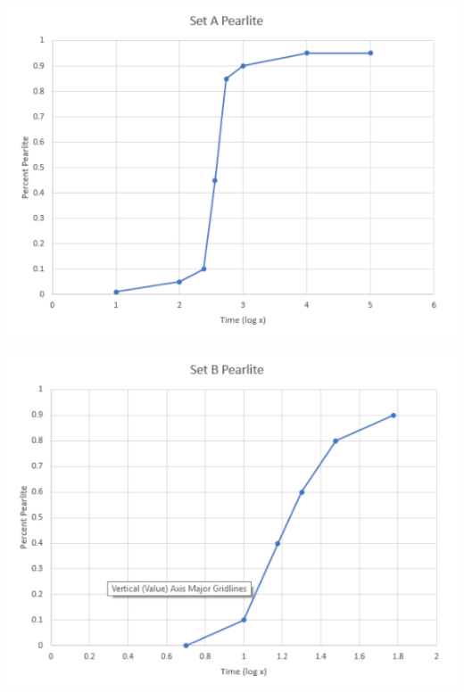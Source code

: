 \documentclass{article}
\begin{document}
\begin{center}
\includegraphics[width=400pt]{12.png}
\end{center}

\begin{center}
\includegraphics[width=400pt]{14.png}
\end{center}
\end{document}
